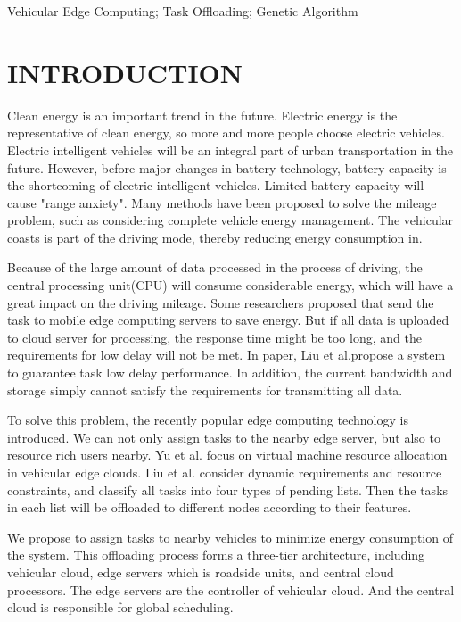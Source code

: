 \documentclass[conference]{IEEEtran}
\begin{document}
\begin{IEEEkeywords}
Vehicular Edge Computing; Task Offloading; Genetic Algorithm
\end{IEEEkeywords}

    \section{INTRODUCTION}
Clean energy is an important trend in the future. Electric energy is the representative of clean energy, so more and more people choose electric vehicles.
Electric intelligent vehicles will be an integral part of urban transportation in the future. However, before major changes in battery technology, battery capacity is the shortcoming of electric intelligent vehicles\cite{battery}. Limited battery capacity will cause "range anxiety". 
Many methods have been proposed to solve the mileage problem, such as considering complete vehicle energy management\cite{complete}. The vehicular coasts is part of the driving mode, thereby reducing energy consumption in\cite{coast}.

Because of the large amount of data processed in the process of driving, the central processing unit(CPU) will consume considerable energy, which will have a great impact on the driving mileage.
Some researchers proposed that send the task to mobile edge computing servers to save energy.
But if all data is uploaded to cloud server for processing, the response time might be too long, and the requirements for low delay will not be met\cite{2021v2mec}. 
In paper\cite{edgeserver}, Liu et al.propose a system to guarantee task low delay performance. 
In addition, the current bandwidth and storage simply cannot satisfy the requirements for transmitting all data.

To solve this problem, the recently popular edge computing technology is introduced. 
We can not only assign tasks to the nearby edge server, but also to resource rich users nearby. 
Yu et al.\cite{yu2013toward} focus on virtual machine resource allocation in vehicular edge clouds. 
Liu et al.\cite{liu2020fourtypes} consider dynamic requirements and resource constraints, and classify all tasks into four types of pending lists. Then the tasks in each list will be offloaded to different nodes according to their features. 

We propose to assign tasks to nearby vehicles to minimize energy consumption of the system. 
This offloading process forms a three-tier architecture, including vehicular cloud, edge servers which is roadside units, and central cloud processors.
The edge servers are the controller of vehicular cloud. And the central cloud is responsible for global scheduling.
\end{document}
